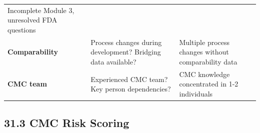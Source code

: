 \documentclass[
  11pt,
  a4paper,
]{report}
\begin{document}
\begin{longtable}[]{@{}lll@{}}
\begin{minipage}[t]{0.33\columnwidth}
Incomplete Module 3, unresolved FDA questions\strut
\end{minipage}\tabularnewline
\begin{minipage}[t]{0.18\columnwidth}\raggedright
\textbf{Comparability}\strut
\end{minipage} & \begin{minipage}[t]{0.40\columnwidth}\raggedright
Process changes during development? Bridging data available?\strut
\end{minipage} & \begin{minipage}[t]{0.33\columnwidth}\raggedright
Multiple process changes without comparability data\strut
\end{minipage}\tabularnewline
\begin{minipage}[t]{0.18\columnwidth}\raggedright
\textbf{CMC team}\strut
\end{minipage} & \begin{minipage}[t]{0.40\columnwidth}\raggedright
Experienced CMC team? Key person dependencies?\strut
\end{minipage} & \begin{minipage}[t]{0.33\columnwidth}\raggedright
CMC knowledge concentrated in 1-2 individuals\strut
\end{minipage}\tabularnewline
\bottomrule
\end{longtable}

\hypertarget{cmc-risk-scoring}{%
\subsection{31.3 CMC Risk Scoring}\label{cmc-risk-scoring}}
\end{document}
